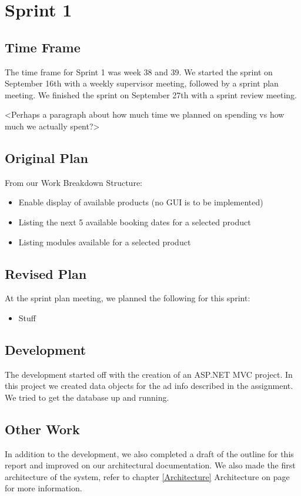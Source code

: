 \section{Sprint 1}

\subsection{Time Frame}
The time frame for Sprint 1 was week 38 and 39. We started the sprint on September 16th with a weekly supervisor meeting, followed by a sprint plan meeting. We finished the sprint on September 27th with a sprint review meeting.

<Perhaps a paragraph about how much time we planned on spending vs how much we actually spent?>

\subsection{Original Plan}
From our Work Breakdown Structure:
\begin{itemize}
	\item Enable display of available products (no GUI is to be implemented)
	\item Listing the next 5 available booking dates for a selected product
	\item Listing modules available for a selected product
\end{itemize}

\subsection{Revised Plan}
At the sprint plan meeting, we planned the following for this sprint:
\begin{itemize}
	\item Stuff
\end{itemize}

\subsection{Development}
The development started off with the creation of an ASP.NET MVC project. In this project we created data objects for the ad info described in the assignment. We tried to get the database up and running.

\subsection{Other Work}
In addition to the development, we also completed a draft of the outline for this report and improved on our architectural documentation.
We also made the first architecture of the system, refer to chapter \ref{Architecture} Architecture on page \pageref{Architecture} for more information.

